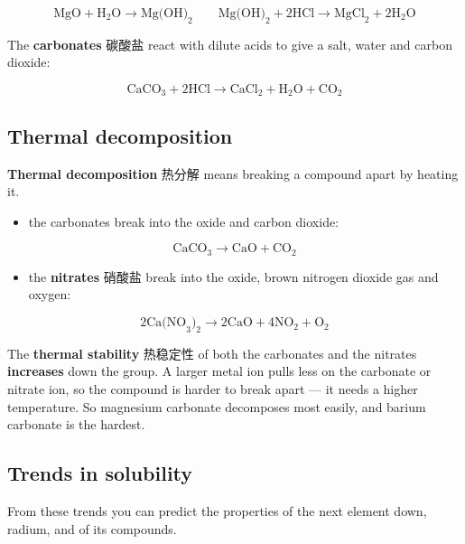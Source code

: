 \documentclass[11pt]{article}
\begin{document}
\[
\text{MgO} + \text{H}_2\text{O} \rightarrow \text{Mg(OH)}_2 \qquad \text{Mg(OH)}_2 + 2\text{HCl} \rightarrow \text{MgCl}_2 + 2\text{H}_2\text{O}
\]

The \textbf{carbonates} 碳酸盐 react with dilute acids to give a salt, water and carbon dioxide:

\[
\text{CaCO}_3 + 2\text{HCl} \rightarrow \text{CaCl}_2 + \text{H}_2\text{O} + \text{CO}_2
\]

\subsection*{Thermal decomposition}

\textbf{Thermal decomposition} 热分解 means breaking a compound apart by heating it.

\begin{itemize}
\item the carbonates break into the oxide and carbon dioxide:

\end{itemize}

\[
\text{CaCO}_3 \rightarrow \text{CaO} + \text{CO}_2
\]

\begin{itemize}
\item the \textbf{nitrates} 硝酸盐 break into the oxide, brown nitrogen dioxide gas and oxygen:

\end{itemize}

\[
2\text{Ca(NO}_3)_2 \rightarrow 2\text{CaO} + 4\text{NO}_2 + \text{O}_2
\]

The \textbf{thermal stability} 热稳定性 of both the carbonates and the nitrates \textbf{increases} down the group. A larger metal ion pulls less on the carbonate or nitrate ion, so the compound is harder to break apart — it needs a higher temperature. So magnesium carbonate decomposes most easily, and barium carbonate is the hardest.

\subsection*{Trends in solubility}

\begin{center}
\end{center}

From these trends you can predict the properties of the next element down, radium, and of its compounds.
\end{document}
